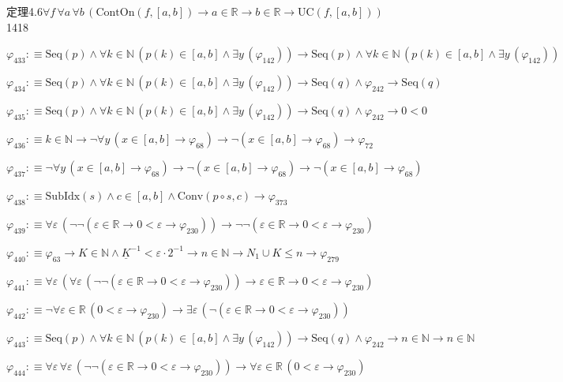 \begin{fullproof}{定理4.6}{$\forall f\,\forall a\,\forall b\,(\mathrm{ContOn}(f,[a,b]) \to a \in \mathbb{R} \to b \in \mathbb{R} \to \mathrm{UC}(f,[a,b]))$}{1418}
\begin{abbrevlist}
\item $\varphi_{433} :\equiv \mathrm{Seq}(p) \land \forall k \in \mathbb{N}\,(p(k) \in [a,b] \land \exists y\,(\varphi_{142})) \to \mathrm{Seq}(p) \land \forall k \in \mathbb{N}\,(p(k) \in [a,b] \land \exists y\,(\varphi_{142}))$
\item $\varphi_{434} :\equiv \mathrm{Seq}(p) \land \forall k \in \mathbb{N}\,(p(k) \in [a,b] \land \exists y\,(\varphi_{142})) \to \mathrm{Seq}(q) \land \varphi_{242} \to \mathrm{Seq}(q)$
\item $\varphi_{435} :\equiv \mathrm{Seq}(p) \land \forall k \in \mathbb{N}\,(p(k) \in [a,b] \land \exists y\,(\varphi_{142})) \to \mathrm{Seq}(q) \land \varphi_{242} \to 0 < 0$
\item $\varphi_{436} :\equiv k \in \mathbb{N} \to \neg \forall y\,(x \in [a,b] \to \varphi_{68}) \to \neg (x \in [a,b] \to \varphi_{68}) \to \varphi_{72}$
\item $\varphi_{437} :\equiv \neg \forall y\,(x \in [a,b] \to \varphi_{68}) \to \neg (x \in [a,b] \to \varphi_{68}) \to \neg (x \in [a,b] \to \varphi_{68})$
\item $\varphi_{438} :\equiv \mathrm{SubIdx}(s) \land c \in [a,b] \land \mathrm{Conv}(p \circ s,c) \to \varphi_{373}$
\item $\varphi_{439} :\equiv \forall \varepsilon\,(\neg \neg (\varepsilon \in \mathbb{R} \to 0 < \varepsilon \to \varphi_{230})) \to \neg \neg (\varepsilon \in \mathbb{R} \to 0 < \varepsilon \to \varphi_{230})$
\item $\varphi_{440} :\equiv \varphi_{63} \to K \in \mathbb{N} \land \underline{K}^{-1} < \varepsilon \cdot 2^{-1} \to n \in \mathbb{N} \to N_{1} \cup K \leq n \to \varphi_{279}$
\item $\varphi_{441} :\equiv \forall \varepsilon\,(\forall \varepsilon\,(\neg \neg (\varepsilon \in \mathbb{R} \to 0 < \varepsilon \to \varphi_{230})) \to \varepsilon \in \mathbb{R} \to 0 < \varepsilon \to \varphi_{230})$
\item $\varphi_{442} :\equiv \neg \forall \varepsilon \in \mathbb{R}\,(0 < \varepsilon \to \varphi_{230}) \to \exists \varepsilon\,(\neg (\varepsilon \in \mathbb{R} \to 0 < \varepsilon \to \varphi_{230}))$
\item $\varphi_{443} :\equiv \mathrm{Seq}(p) \land \forall k \in \mathbb{N}\,(p(k) \in [a,b] \land \exists y\,(\varphi_{142})) \to \mathrm{Seq}(q) \land \varphi_{242} \to n \in \mathbb{N} \to n \in \mathbb{N}$
\item $\varphi_{444} :\equiv \forall \varepsilon\,\forall \varepsilon\,(\neg \neg (\varepsilon \in \mathbb{R} \to 0 < \varepsilon \to \varphi_{230})) \to \forall \varepsilon \in \mathbb{R}\,(0 < \varepsilon \to \varphi_{230})$

\end{abbrevlist}
\end{fullproof}
